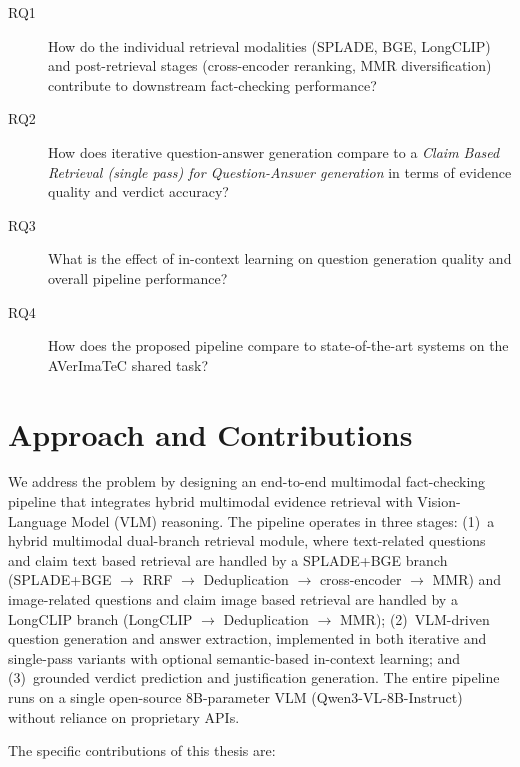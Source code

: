 \begin{description}
    \item[RQ1] How do the individual retrieval modalities (SPLADE, BGE, LongCLIP) and post-retrieval stages (cross-encoder reranking, MMR diversification) contribute to downstream fact-checking performance?
    \item[RQ2] How does iterative question-answer generation compare to a \textit{Claim Based Retrieval (single pass) for Question-Answer generation} in terms of evidence quality and verdict accuracy?
    \item[RQ3] What is the effect of in-context learning on question generation quality and overall pipeline performance?
    \item[RQ4] How does the proposed pipeline compare to state-of-the-art systems on the AVerImaTeC shared task?
\end{description}

\section{Approach and Contributions}
\label{sec:intro:approach}

We address the problem by designing an end-to-end multimodal fact-checking pipeline that integrates hybrid multimodal evidence retrieval with Vision-Language Model (VLM) reasoning. The pipeline operates in three stages: (1)~a hybrid multimodal dual-branch retrieval module, where text-related questions and claim text based retrieval are handled by a SPLADE+BGE branch (SPLADE+BGE $\rightarrow$ RRF $\rightarrow$ Deduplication $\rightarrow$  cross-encoder $\rightarrow$ MMR) and image-related questions and claim image based retrieval are handled by a LongCLIP branch (LongCLIP $\rightarrow$ Deduplication $\rightarrow$ MMR); (2)~VLM-driven question generation and answer extraction, implemented in both iterative and single-pass variants with optional semantic-based in-context learning; and (3)~grounded verdict prediction and justification generation. The entire pipeline runs on a single open-source 8B-parameter VLM (Qwen3-VL-8B-Instruct) without reliance on proprietary APIs.

The specific contributions of this thesis are:


